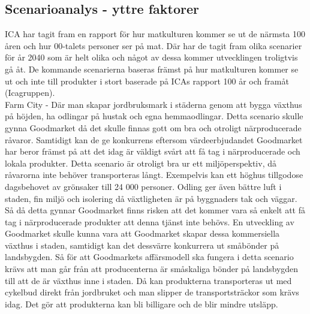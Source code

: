 \documentclass[10pt,a4paper,oneside]{article}
\begin{document}
\subsection{Scenarioanalys  - yttre faktorer}

ICA har tagit fram en rapport för hur matkulturen kommer se ut de närmsta 100 åren och hur 00-talets personer ser på mat. Där har de tagit fram olika scenarier för år 2040 som är helt olika och något av dessa kommer utvecklingen troligtvis gå åt. De kommande scenarierna baseras främst på hur matkulturen kommer se ut och inte till produkter i stort baserade på ICAs rapport 100 år och framåt (Icagruppen). \\ 

Farm City - Där man skapar jordbruksmark i städerna genom att bygga växthus på höjden, ha odlingar på hustak och egna hemmaodlingar. Detta scenario skulle gynna Goodmarket då det skulle finnas gott om bra och otroligt närproducerade råvaror. Samtidigt kan de ge konkurrens eftersom värdeerbjudandet Goodmarket har beror främst på att det idag är väldigt svårt att få tag i närproducerade och lokala produkter. Detta scenario är otroligt bra ur ett miljöperspektiv, då råvarorna inte behöver transporteras långt. Exempelvis kan ett höghus tillgodose dagsbehovet av grönsaker till 24 000 personer. Odling ger även bättre luft i staden, fin miljö och isolering då växtligheten är på byggnaders tak och väggar. Så då detta gynnar Goodmarket finns risken att det kommer vara så enkelt att få tag i närproducerade produkter att denna tjänst inte behövs. En utveckling av Goodmarket skulle kunna vara att Goodmarket skapar dessa kommersiella växthus i staden, samtidigt kan det dessvärre konkurrera ut småbönder på landsbygden. Så för att Goodmarkets affärsmodell ska fungera i detta scenario krävs att man går från att producenterna är småskaliga bönder på landsbygden till att de är växthus inne i staden. Då kan produkterna transporteras ut med cykelbud direkt från jordbruket och man slipper de transportsträckor som krävs idag. Det gör att produkterna kan bli billigare och de blir mindre utsläpp. \\
\end{document}
